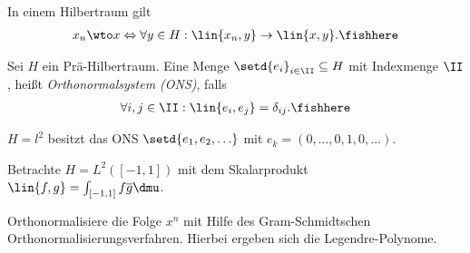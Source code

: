 \begin{corn}
In einem Hilbertraum gilt
\begin{align*}
x_n\wto x \Leftrightarrow \forall y\in H: \lin{x_n,y}\to \lin{x,y}.\fishhere
\end{align*}
\end{corn}

\begin{defn}
\label{defn:5.19}
Sei $H$ ein Prä-Hilbertraum. Eine Menge $\setd{e_i}_{i\in\II}\subseteq H$ mit 
Indexmenge $\II$, heißt \emph{Orthonormalsystem (ONS)},
falls
\begin{align*}
\forall i,j\in\II : \lin{e_i,e_j} = \delta_{ij}.\fishhere
\end{align*}
\end{defn}

\begin{bsp}
\label{bsp:5.20}
\begin{bspenum}
  \item $H=l^2$ besitzt das ONS $\setd{e_1,e_2,\ldots}$ mit
  $e_k=(0,\ldots,0,1,0,\ldots)$.
  \item Betrachte $H=L^2([-1,1])$ mit dem Skalarprodukt $\lin{f,g}=\int_{[-1,1]}
  f\overline{g}\dmu$.
  
  Orthonormalisiere die Folge $x^n$ mit Hilfe des Gram-Schmidtschen
  Orthonormalisierungsverfahren. Hierbei ergeben sich die
  Legendre-Polynome.\bsphere
\end{bspenum}
\end{bsp}

